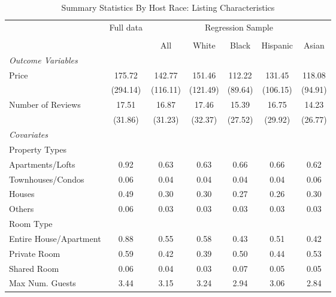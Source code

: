 \begin{table}[htbp]
\caption{Summary Statistics By Host Race: Listing Characteristics}
\begin{center}%
\small\begin{tabular}{l c | c | c c c c}
& \multicolumn{1}{c}{Full data} & \multicolumn{5}{c}{Regression Sample}
\\
 \cmidrule(r){3-7}
\\
 & \multicolumn{1}{c}{} & \multicolumn{1}{c}{All} & White & Black & Hispanic & Asian
\\
\hline\hline\noalign{\smallskip} 
 \textit{\textit{Outcome Variables}} & & & & & & \\ Price & 175.72 & 142.77 & 151.46 & 112.22 & 131.45 & 118.08 \\
 & (294.14) & (116.11) & (121.49) & (89.64) & (106.15) & (94.91) \\
 Number of Reviews & 17.51 & 16.87 & 17.46 & 15.39 & 16.75 & 14.23 \\
 & (31.86) & (31.23) & (32.37) & (27.52) & (29.92) & (26.77) \\
 \textit{Covariates} & & & & & & \\ \hline Property Types & & & & & & \\ \hspace{10bp}Apartments/Lofts    & 0.92 & 0.63 & 0.63 & 0.66 & 0.66 & 0.62 \\ \hspace{10bp}Townhouses/Condos   & 0.06 & 0.04 & 0.04 & 0.04 & 0.04 & 0.06 \\ \hspace{10bp}Houses                      & 0.49 & 0.30 & 0.30 & 0.27 & 0.26 & 0.30 \\ \hspace{10bp}Others                              & 0.06 & 0.03 & 0.03 & 0.03 & 0.03 & 0.03 \\Room Type &&&&&& \\ \hspace{10bp}Entire House/Apartment      & 0.88 & 0.55 & 0.58 & 0.43 & 0.51 & 0.42 \\ \hspace{10bp}Private Room                        & 0.59 & 0.42 & 0.39 & 0.50 & 0.44 & 0.53 \\ \hspace{10bp}Shared Room                         & 0.06 & 0.04 & 0.03 & 0.07 & 0.05 & 0.05 \\ Max Num. Guests & 3.44 & 3.15 & 3.24 & 2.94 & 3.06 & 2.84 \\

\end{tabular}
\end{center}
\end{table}
